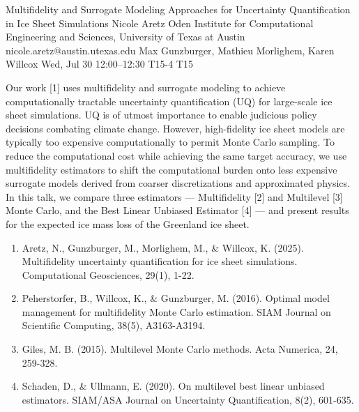 \begin{talk}
  {Multifidelity and Surrogate Modeling Approaches for Uncertainty Quantification in Ice Sheet Simulations}%
  {Nicole Aretz}%
  {Oden Institute for Computational Engineering and Sciences, University of Texas at Austin}%
  {nicole.aretz@austin.utexas.edu}%
  {Max Gunzburger, Mathieu Morlighem, Karen Willcox}%
  {}%
  {Wed, Jul 30 12:00--12:30}%
  {T15-4}%
  {T15}%
  
    
   
Our work [1] uses multifidelity and surrogate modeling to achieve computationally tractable uncertainty quantification (UQ) for large-scale ice sheet simulations. UQ is of utmost importance to enable judicious policy decisions combating climate change. However, high-fidelity ice sheet models are typically too expensive computationally to permit Monte Carlo sampling. To reduce the computational cost while achieving the same target accuracy, we use multifidelity estimators to shift the computational burden onto less expensive surrogate models derived from coarser discretizations and approximated physics. In this talk, we compare three estimators — Multifidelity [2] and Multilevel [3] Monte Carlo, and the Best Linear Unbiased Estimator [4] — and present results for the expected ice mass loss of the Greenland ice sheet.

\medskip

\begin{enumerate}
 \item[{[1]}] Aretz, N., Gunzburger, M., Morlighem, M., \& Willcox, K. (2025). Multifidelity uncertainty quantification for ice sheet simulations. Computational Geosciences, 29(1), 1-22.
 \item[{[2]}] Peherstorfer, B., Willcox, K., \& Gunzburger, M. (2016). Optimal model management for multifidelity Monte Carlo estimation. SIAM Journal on Scientific Computing, 38(5), A3163-A3194.
    \item[{[3]}] Giles, M. B. (2015). Multilevel Monte Carlo methods. Acta Numerica, 24, 259-328.
    \item[{[4]}] Schaden, D., \& Ullmann, E. (2020). On multilevel best linear unbiased estimators. SIAM/ASA Journal on Uncertainty Quantification, 8(2), 601-635.
\end{enumerate}

\end{talk}

